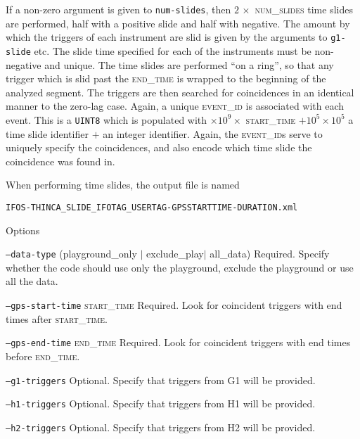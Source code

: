 \begin{entry}
If a non-zero argument is given to \texttt{num-slides}, then $2 \, \times$
\textsc{num\_slides} time slides are performed, half with a positive
slide and half with negative.  The amount by which the triggers of each
instrument are slid is given by the arguments to \texttt{g1-slide} etc.  The
slide time specified for each of the instruments must be non-negative and
unique.  The time slides are performed ``on a ring'', so that any trigger
which is slid past the \textsc{end\_time} is wrapped to the beginning of the
analyzed segment.  The triggers are then searched for coincidences in an
identical manner to the zero-lag case.  Again, a unique \textsc{event\_id} is
associated with each event.  This is a \texttt{UINT8} which is populated with
$\times 10^{9} \times$ \textsc{start\_time} $+ 10^{5} \times 10^{5}$ a time
slide identifier $+$ an integer identifier.  Again, the \textsc{event\_id}s
serve to uniquely specify the coincidences, and also encode which time slide
the coincidence was found in.  

When performing time slides, the output file is named 
\begin{center}
\texttt{IFOS-THINCA\_SLIDE\_IFOTAG\_USERTAG-GPSSTARTTIME-DURATION.xml}\\
\end{center}


\item[Options]\leavevmode
\begin{entry}

\item[\texttt{--data-type} (playground\_only $\mid$ exclude\_play$\mid$
all\_data)]
Required.  Specify whether the code should use only the playground, exclude
the playground or use all the data. 

\item[\texttt{--gps-start-time} \textsc{start\_time}] Required.  Look
for coincident triggers with end times after \textsc{start\_time}.

\item[\texttt{--gps-end-time} \textsc{end\_time}] Required.  Look for
coincident triggers with end times before \textsc{end\_time}.


\item[\texttt{--g1-triggers}] Optional.  Specify that triggers from G1 will be
provided.

\item[\texttt{--h1-triggers}] Optional.  Specify that triggers from H1 will be
provided.
\item[\texttt{--h2-triggers}] Optional.  Specify that triggers from H2 will be
provided.


\end{entry}
\end{entry}
